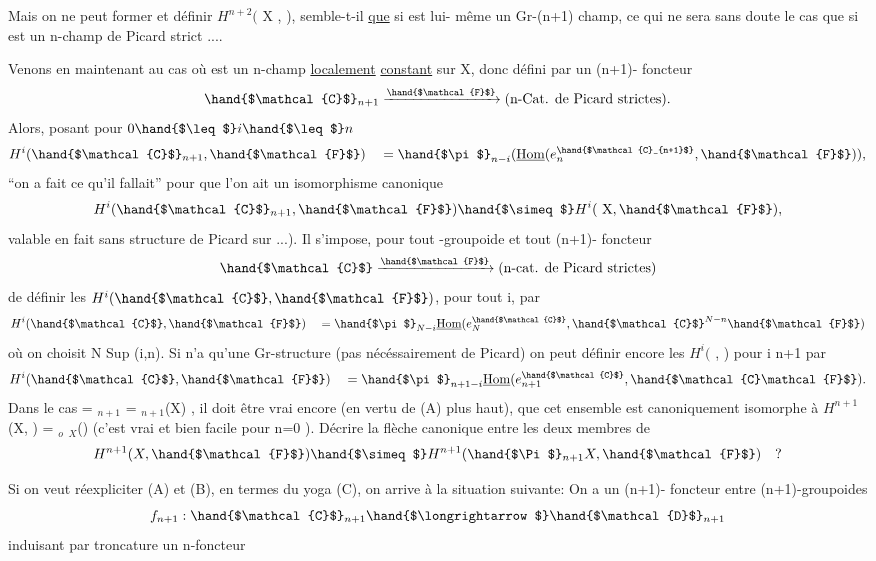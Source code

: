  

Mais on ne peut former  et définir $H^{n+2}($ X ,  ), semble-t-il
\uline{que} si  est lui- même un Gr-(n+1) champ, ce qui ne sera sans
doute le cas que si  est un n-champ de Picard strict ....

Venons en maintenant au cas où  est un n-champ \uline{localement}
\uline{constant} sur X, donc défini par un (n+1)- foncteur
\[ \hand{$\mathcal{C}$}_{n+1} \xrightarrow{\hand{$\mathcal{F}$}} \text{(n-Cat. de Picard strictes).} \]
Alors, posant pour $0 \hand{$\leq$} i \hand{$\leq$} n$
\[ H^i(\hand{$\mathcal{C}$}_{n+1}, \hand{$\mathcal{F}$}) \quad = \hand{$\pi$}_{n-i} (\underline{\text{Hom}} (e_n^{\hand{$\mathcal{C}_{n+1}$}}, \hand{$\mathcal{F}$})), \]
``on a fait ce qu'il fallait'' pour que l'on ait un isomorphisme canonique
\[ H^i(\hand{$\mathcal{C}$}_{n+1}, \hand{$\mathcal{F}$}) \hand{$\simeq$} H^i(\text{ X}, \hand{$\mathcal{F}$} ), \]
\hand{(}valable en fait sans structure de Picard sur  ...). Il s'impose, pour
tout \hand{$\infty$} -groupoide  et tout (n+1)- foncteur
\[ \hand{$\mathcal{C}$} \xrightarrow{\hand{$\mathcal{F}$}} \text{(n-cat. de Picard strictes)} \]
de définir les $H^i(\hand{$\mathcal{C}$}, \hand{$\mathcal{F}$})$, pour tout i, par
\[ H^i(\hand{$\mathcal{C}$},\hand{$\mathcal{F}$}) \quad = \hand{$\pi$}_{N-i} \underline{\text{Hom}} (e_N^{\hand{$\mathcal{C}$}} ,\hand{$\mathcal{C}$}^{N-n} \hand{$\mathcal{F}$}) \]
où on choisit N \hand{$\geq$}Sup (i,n). Si  n'a qu'une Gr-structure (pas
nécéssairement de Picard) on peut définir encore les $H^i($ ,  ) pour
i \hand{$\leq$} n+1 par
\[ H^i(\hand{$\mathcal{C}$}, \hand{$\mathcal{F}$} ) \quad = \hand{$\pi$}_{n+1-i} \underline{\text{Hom}} ( e_{n+1}^{\hand{$\mathcal{C}$}} , \hand{$\mathcal{C}\mathcal{F}$}). \]
Dans le cas  = $_{n+1}$ = \hand{$\Pi$}$_{n+1}$(X) , il doit être vrai encore
(en vertu de (A) plus haut), que cet ensemble est canoniquement isomorphe
à $H^{n+1}$(X, ) = \hand{$\pi$}$_o$ \hand{$\Gamma$}$_X$() (c'est vrai et bien facile pour n=0 ).
Décrire la flèche canonique entre les deux membres de
\[ H^{n+1}(X , \hand{$\mathcal{F}$}) \hand{$\simeq$} H^{n+1}(\hand{$\Pi$}_{n+1}X, \hand{$\mathcal{F}$}) \quad ? \]

Si on veut réexpliciter (A) et (B), en termes du yoga (C), on arrive
à la situation suivante:
On a un (n+1)- foncteur entre (n+1)-groupoides
\[ f_{n+1} : \hand{$\mathcal{C}$}_{n+1} \hand{$\longrightarrow$} \hand{$\mathcal{D}$}_{n+1} \]
induisant par troncature un n-foncteur

